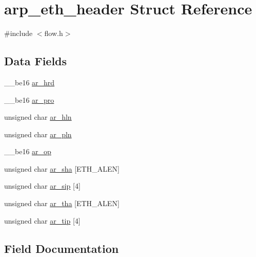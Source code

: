 \hypertarget{structarp__eth__header}{}\section{arp\+\_\+eth\+\_\+header Struct Reference}
\label{structarp__eth__header}


{\ttfamily \#include $<$flow.\+h$>$}

\subsection*{Data Fields}
\begin{DoxyCompactItemize}
\item 
\+\_\+\+\_\+be16 \hyperlink{structarp__eth__header_afe4c385a8760054d1d9da4e06b72dc3a}{ar\+\_\+hrd}
\item 
\+\_\+\+\_\+be16 \hyperlink{structarp__eth__header_aa0a6c956f6f9001377528f86f94d91b4}{ar\+\_\+pro}
\item 
unsigned char \hyperlink{structarp__eth__header_a8feceb41fdd95e4a0f1e17e56b957bf4}{ar\+\_\+hln}
\item 
unsigned char \hyperlink{structarp__eth__header_abc215d845eb12176276c8cee0501ecd8}{ar\+\_\+pln}
\item 
\+\_\+\+\_\+be16 \hyperlink{structarp__eth__header_a0cad73c318ab7ea788fa836f6b5a011d}{ar\+\_\+op}
\item 
unsigned char \hyperlink{structarp__eth__header_a569cddaf9ed4aa40b04b60958783e908}{ar\+\_\+sha} \mbox{[}E\+T\+H\+\_\+\+A\+L\+E\+N\mbox{]}
\item 
unsigned char \hyperlink{structarp__eth__header_ae584842ae04804b2f5cf3c26fb135961}{ar\+\_\+sip} \mbox{[}4\mbox{]}
\item 
unsigned char \hyperlink{structarp__eth__header_a490c51d5f01a32e78c57d020ca2662f6}{ar\+\_\+tha} \mbox{[}E\+T\+H\+\_\+\+A\+L\+E\+N\mbox{]}
\item 
unsigned char \hyperlink{structarp__eth__header_a9ed88031c0dd2f554f1dc455e878945d}{ar\+\_\+tip} \mbox{[}4\mbox{]}
\end{DoxyCompactItemize}


\subsection{Field Documentation}
\hypertarget{structarp__eth__header_a8feceb41fdd95e4a0f1e17e56b957bf4}{}
